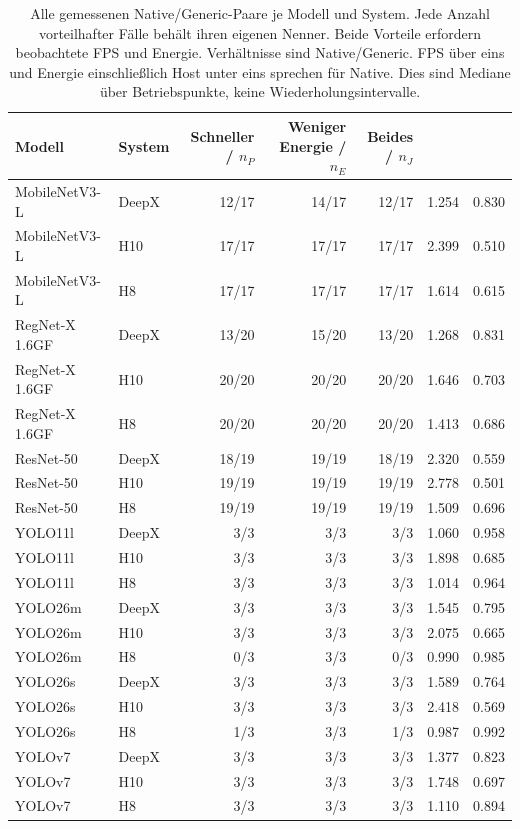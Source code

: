 \begingroup\small
\begin{longtable}{l l r r r S[table-format=1.3] S[table-format=1.3]}
\caption{Alle gemessenen Native/Generic-Paare je Modell und System. Jede Anzahl vorteilhafter Fälle behält ihren eigenen Nenner. Beide Vorteile erfordern beobachtete FPS und Energie. Verhältnisse sind Native/Generic. FPS über eins und Energie einschließlich Host unter eins sprechen für Native. Dies sind Mediane über Betriebspunkte, keine Wiederholungsintervalle.}\\
\toprule
Modell & System & Schneller / $n_P$ & Weniger Energie / $n_E$ & Beides / $n_J$ & {} & {} \\
\midrule\endhead
MobileNetV3-L & DeepX & 12/17 & 14/17 & 12/17 & 1.254 & 0.830 \\
MobileNetV3-L & H10 & 17/17 & 17/17 & 17/17 & 2.399 & 0.510 \\
MobileNetV3-L & H8 & 17/17 & 17/17 & 17/17 & 1.614 & 0.615 \\
RegNet-X 1.6GF & DeepX & 13/20 & 15/20 & 13/20 & 1.268 & 0.831 \\
RegNet-X 1.6GF & H10 & 20/20 & 20/20 & 20/20 & 1.646 & 0.703 \\
RegNet-X 1.6GF & H8 & 20/20 & 20/20 & 20/20 & 1.413 & 0.686 \\
ResNet-50 & DeepX & 18/19 & 19/19 & 18/19 & 2.320 & 0.559 \\
ResNet-50 & H10 & 19/19 & 19/19 & 19/19 & 2.778 & 0.501 \\
ResNet-50 & H8 & 19/19 & 19/19 & 19/19 & 1.509 & 0.696 \\
YOLO11l & DeepX & 3/3 & 3/3 & 3/3 & 1.060 & 0.958 \\
YOLO11l & H10 & 3/3 & 3/3 & 3/3 & 1.898 & 0.685 \\
YOLO11l & H8 & 3/3 & 3/3 & 3/3 & 1.014 & 0.964 \\
YOLO26m & DeepX & 3/3 & 3/3 & 3/3 & 1.545 & 0.795 \\
YOLO26m & H10 & 3/3 & 3/3 & 3/3 & 2.075 & 0.665 \\
YOLO26m & H8 & 0/3 & 3/3 & 0/3 & 0.990 & 0.985 \\
YOLO26s & DeepX & 3/3 & 3/3 & 3/3 & 1.589 & 0.764 \\
YOLO26s & H10 & 3/3 & 3/3 & 3/3 & 2.418 & 0.569 \\
YOLO26s & H8 & 1/3 & 3/3 & 1/3 & 0.987 & 0.992 \\
YOLOv7 & DeepX & 3/3 & 3/3 & 3/3 & 1.377 & 0.823 \\
YOLOv7 & H10 & 3/3 & 3/3 & 3/3 & 1.748 & 0.697 \\
YOLOv7 & H8 & 3/3 & 3/3 & 3/3 & 1.110 & 0.894 \\
\bottomrule
\end{longtable}
\endgroup

